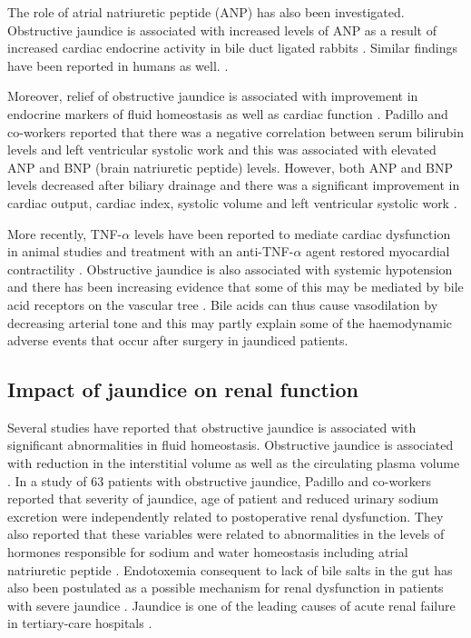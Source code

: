 The role of atrial natriuretic peptide (ANP) has also been investigated. 
Obstructive jaundice is associated with increased levels of ANP as a result of increased cardiac endocrine activity in bile duct ligated rabbits \parencite{pereira_increased_1994}. 
Similar findings have been reported in humans as well. \parencite{gallardo_increased_1998, martinez-rodenas_circulating_1998}. 

Moreover, relief of obstructive jaundice is associated with improvement in endocrine markers of fluid homeostasis as well as cardiac function \parencite{padillo_improved_2001, gallardo_increased_1998}. 
Padillo and co-workers reported that there was a negative correlation between serum bilirubin levels and left ventricular systolic work and this was associated with elevated ANP and BNP (brain natriuretic peptide) levels. 
However, both ANP and BNP levels decreased after biliary drainage and there was a significant improvement in cardiac output, cardiac index, systolic volume and left ventricular systolic work \parencite{padillo_improved_2001}. 
	
More recently, TNF-$\alpha$ levels have been reported to mediate cardiac dysfunction in animal studies and treatment with an anti-TNF-$\alpha$ agent restored myocardial contractility \parencite{yang_mechanisms_2010}. 
Obstructive jaundice is also associated with systemic hypotension and there has been increasing evidence that some of this may be mediated by bile acid receptors on the vascular tree \parencite{green_systemic_1995, lefebvre_role_2009}. 
Bile acids can thus cause vasodilation by decreasing arterial tone and this may partly explain some of the haemodynamic adverse events that occur after surgery in jaundiced patients.

\subsection{Impact of jaundice on renal function}

Several studies have reported that obstructive jaundice is associated with significant abnormalities in fluid homeostasis. 
Obstructive jaundice is associated with reduction in the interstitial volume as well as the circulating plasma volume \parencite{sitges-serra_body_1992, padillo_preoperative_1999}. 
In a study of 63 patients with obstructive jaundice, Padillo and co-workers reported that severity of jaundice, age of patient and reduced urinary sodium excretion were independently related to postoperative renal dysfunction. 
They also reported that these variables were related to abnormalities in the levels of hormones responsible for sodium and water homeostasis including atrial natriuretic peptide \parencite{padillo_multivariate_2005}. 
Endotoxemia consequent to lack of bile salts in the gut has also been postulated as a possible mechanism for renal dysfunction in patients with severe jaundice \parencite{bailey_endotoxin_1976}. 
Jaundice is one of the leading causes of acute renal failure in tertiary-care hospitals \parencite{liano_epidemiology_1996}. 

